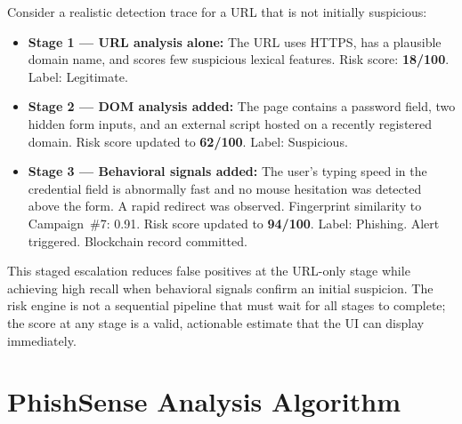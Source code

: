 \documentclass[conference]{IEEEtran}
\begin{document}
Consider a realistic detection trace for a URL that is not initially suspicious:
\begin{itemize}[nosep,leftmargin=*]
\item \textbf{Stage 1 --- URL analysis alone:} The URL uses HTTPS, has a plausible domain name,
  and scores few suspicious lexical features. Risk score: \textbf{18/100}. Label: Legitimate.
\item \textbf{Stage 2 --- DOM analysis added:} The page contains a password field, two hidden
  form inputs, and an external script hosted on a recently registered domain. Risk score
  updated to \textbf{62/100}. Label: Suspicious.
\item \textbf{Stage 3 --- Behavioral signals added:} The user's typing speed in the credential
  field is abnormally fast and no mouse hesitation was detected above the form. A rapid redirect
  was observed. Fingerprint similarity to Campaign~\#7: 0.91. Risk score updated to
  \textbf{94/100}. Label: Phishing. Alert triggered. Blockchain record committed.
\end{itemize}

This staged escalation reduces false positives at the URL-only stage while achieving high
recall when behavioral signals confirm an initial suspicion.
The risk engine is not a sequential pipeline that must wait for all stages to complete; the
score at any stage is a valid, actionable estimate that the UI can display immediately.

\section{PhishSense Analysis Algorithm}
\end{document}
